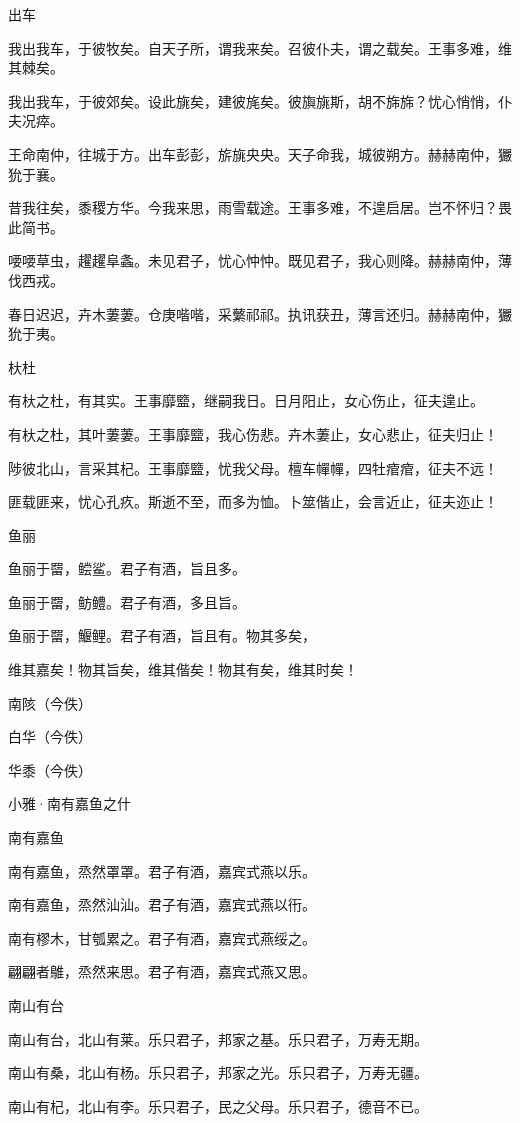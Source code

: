出车

我出我车，于彼牧矣。自天子所，谓我来矣。召彼仆夫，谓之载矣。王事多难，维其棘矣。

我出我车，于彼郊矣。设此旐矣，建彼旄矣。彼旟旐斯，胡不旆旆？忧心悄悄，仆夫况瘁。

王命南仲，往城于方。出车彭彭，旂旐央央。天子命我，城彼朔方。赫赫南仲，玁狁于襄。

昔我往矣，黍稷方华。今我来思，雨雪载途。王事多难，不遑启居。岂不怀归？畏此简书。

喓喓草虫，趯趯阜螽。未见君子，忧心忡忡。既见君子，我心则降。赫赫南仲，薄伐西戎。

春日迟迟，卉木萋萋。仓庚喈喈，采蘩祁祁。执讯获丑，薄言还归。赫赫南仲，玁狁于夷。

杕杜

有杕之杜，有其实。王事靡盬，继嗣我日。日月阳止，女心伤止，征夫遑止。

有杕之杜，其叶萋萋。王事靡盬，我心伤悲。卉木萋止，女心悲止，征夫归止！

陟彼北山，言采其杞。王事靡盬，忧我父母。檀车幝幝，四牡痯痯，征夫不远！

匪载匪来，忧心孔疚。斯逝不至，而多为恤。卜筮偕止，会言近止，征夫迩止！

鱼丽

鱼丽于罶，鲿鲨。君子有酒，旨且多。

鱼丽于罶，鲂鳢。君子有酒，多且旨。

鱼丽于罶，鰋鲤。君子有酒，旨且有。物其多矣，

维其嘉矣！物其旨矣，维其偕矣！物其有矣，维其时矣！

南陔（今佚）

白华（今佚）

华黍（今佚）




小雅·南有嘉鱼之什


南有嘉鱼

南有嘉鱼，烝然罩罩。君子有酒，嘉宾式燕以乐。

南有嘉鱼，烝然汕汕。君子有酒，嘉宾式燕以衎。

南有樛木，甘瓠累之。君子有酒，嘉宾式燕绥之。

翩翩者鵻，烝然来思。君子有酒，嘉宾式燕又思。

南山有台

南山有台，北山有莱。乐只君子，邦家之基。乐只君子，万寿无期。

南山有桑，北山有杨。乐只君子，邦家之光。乐只君子，万寿无疆。

南山有杞，北山有李。乐只君子，民之父母。乐只君子，德音不已。

